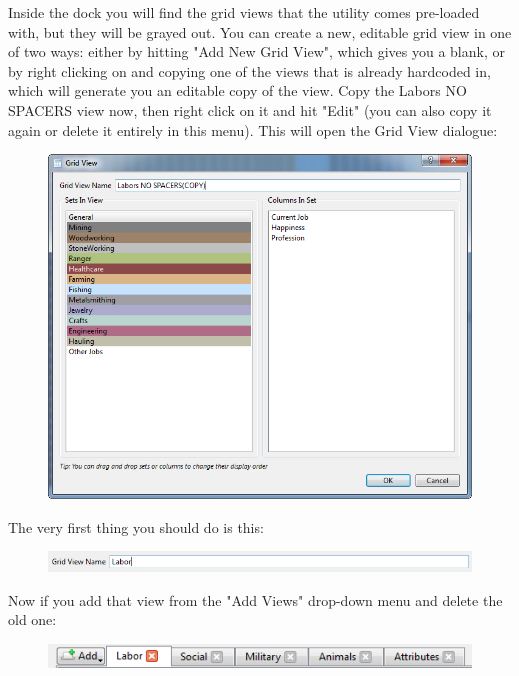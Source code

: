 \documentclass[]{article}
\begin{document}
Inside the dock you will find the grid views that the utility comes pre-loaded with, but they will be
grayed out. You can create a new, editable grid view in one of two ways: either by hitting "Add New Grid
View", which gives you a blank, or by right clicking on and copying one of the views that is already
hardcoded in, which will generate you an editable copy of the view. Copy the Labors NO SPACERS view now,
then right click on it and hit "Edit" (you can also copy it again or delete it entirely in this menu).
This will open the Grid View dialogue:
\begin{figure}[h!]
\vspace{-5pt}
\centering
\includegraphics[scale=.86]{Sec3Fig14}
\vspace{-5pt}
\end{figure}

\newpage
The very first thing you should do is this:
\begin{figure}[h!]
\centering
\includegraphics[scale=.9]{Sec3Fig15}
\end{figure}

Now if you add that view from the "Add Views" drop-down menu and delete the old one:
\begin{figure}[h!]
\centering
\includegraphics{Sec3Fig16}
\end{figure}
\end{document}
